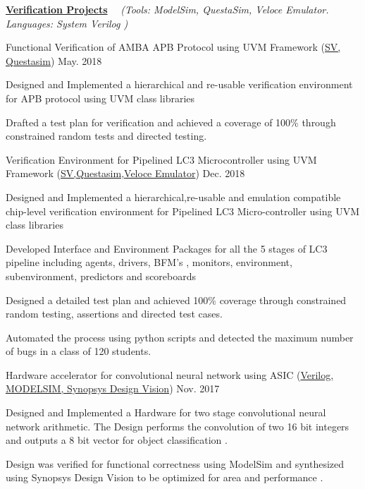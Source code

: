 \begin{flushleft}
  \par\addvspace{-1.5mm}
  \fontsize{10pt}{1em}\selectfont\underline{\textbf{\color{black}Verification Projects}} \ \ \textit{(\color{text}Tools: ModelSim, QuestaSim, Veloce Emulator.  Languages: System Verilog )}
\end{flushleft}
\begin{cvprojects}
  \cvproject
    {Functional Verification of AMBA APB Protocol using UVM Framework \fontsize{8pt}{1em}\selectfont(\underline {\color{awesome-red}SV, Questasim})} 
    {\color{darkgray}May. 2018}
    {
      \begin{cvprojectitems}
        \item {Designed and Implemented a hierarchical and re-usable verification environment for APB protocol using UVM class libraries}
        \item {Drafted a test plan for verification and achieved a coverage of 100\% through constrained random tests and directed testing. }
      \end{cvprojectitems}
    }
  \cvproject
    {Verification Environment for Pipelined LC3 Microcontroller using UVM Framework \fontsize{8pt}{1em}\selectfont(\underline {\color{awesome-red}SV,Questasim,Veloce Emulator})}
    {\color{darkgray}Dec. 2018}
    {
      \begin{cvprojectitems}
        \item {Designed and Implemented a hierarchical,re-usable and emulation compatible chip-level verification environment for Pipelined LC3 Micro-controller using UVM class libraries}
        \item {Developed Interface and Environment Packages for all the 5 stages of LC3 pipeline including agents, drivers, BFM's , monitors, environment, subenvironment, predictors and scoreboards}
        \item {Designed a detailed test plan and achieved 100\% coverage through constrained random testing, assertions and directed test cases.}
        \item {Automated the process using python scripts and detected the maximum number of bugs in a class of 120 students.}
      \end{cvprojectitems}
    }
    \par\addvspace{2ex}
    \cvproject
    {Hardware accelerator for convolutional neural network using ASIC \fontsize{8pt}{1em}\selectfont(\underline {\color{awesome-red}Verilog, MODELSIM, Synopsys Design Vision})}
    {\color{darkgray}Nov. 2017}
    {
      \begin{cvprojectitems}
        \item {Designed and Implemented a Hardware for two stage convolutional neural network arithmetic. The Design performs the convolution of two 16 bit integers and outputs a 8 bit vector for object classification . }
        \item {Design was verified for functional correctness using ModelSim and synthesized using Synopsys Design Vision to be optimized for area and performance .} 
      \end{cvprojectitems}
    }

\end{cvprojects}